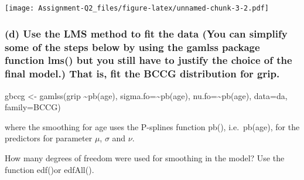 \documentclass[
]{article}
\newenvironment{Shaded}{\begin{snugshade}}{\end{snugshade}}
\newcommand{\AttributeTok}[1]{\textcolor[rgb]{0.13,0.29,0.53}{#1}}
\newcommand{\CommentTok}[1]{\textcolor[rgb]{0.56,0.35,0.01}{\textit{#1}}}
\newcommand{\DecValTok}[1]{\textcolor[rgb]{0.00,0.00,0.81}{#1}}
\newcommand{\FunctionTok}[1]{\textcolor[rgb]{0.13,0.29,0.53}{\textbf{#1}}}
\newcommand{\NormalTok}[1]{#1}
\newcommand{\SpecialCharTok}[1]{\textcolor[rgb]{0.81,0.36,0.00}{\textbf{#1}}}
\newcommand{\StringTok}[1]{\textcolor[rgb]{0.31,0.60,0.02}{#1}}
\begin{document}
\begin{Shaded}
\end{Shaded}

\texttt{[image: Assignment-Q2\_files/figure-latex/unnamed-chunk-3-2.pdf]}

\hypertarget{d-use-the-lms-method-to-fit-the-data-you-can-simplify-some-of-the-steps-below-by-using-the-gamlss-package-function-lms-but-you-still-have-to-justify-the-choice-of-the-final-model.-that-is-fit-the-bccg-distribution-for-grip.}{%
\subsubsection{(d) Use the LMS method to fit the data (You can simplify
some of the steps below by using the gamlss package function lms() but
you still have to justify the choice of the final model.) That is, fit
the BCCG distribution for
grip.}\label{d-use-the-lms-method-to-fit-the-data-you-can-simplify-some-of-the-steps-below-by-using-the-gamlss-package-function-lms-but-you-still-have-to-justify-the-choice-of-the-final-model.-that-is-fit-the-bccg-distribution-for-grip.}}

gbccg \textless- gamlss(grip \textasciitilde pb(age),
sigma.fo=\textasciitilde pb(age), nu.fo=\textasciitilde pb(age),
data=da, family=BCCG)

where the smoothing for age uses the P-splines function pb(),
i.e.~pb(age), for the predictors for parameter \(\mu\), \(\sigma\) and
\(\nu\).

How many degrees of freedom were used for smoothing in the model? Use
the function edf()or edfAll().
\end{document}
